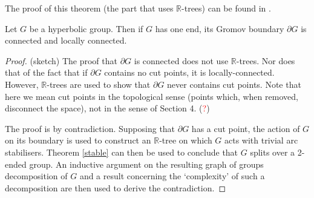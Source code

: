 The proof of this theorem (the part that uses $\mathbb{R}$-trees) can be found in \cite{Swarup}.
\begin{theorem}
    Let $G$ be a hyperbolic group. Then if $G$ has one end, its Gromov boundary $\partial G$ is connected and locally connected.
\end{theorem}

\begin{proof}
    (sketch) The proof that $\partial G$ is connected does not use $\mathbb{R}$-trees. Nor does that of the fact that if $\partial G$ contains no cut points, it is locally-connected. However, $\mathbb{R}$-trees are used to show that $\partial G$ never contains cut points. Note that here we mean cut points in the topological sense (points which, when removed, disconnect the space), not in the sense of Section 4. (\textcolor{red}{?})
    
    The proof is by contradiction. Supposing that $\partial G$ has a cut point, the action of $G$ on its boundary is used to construct an $\mathbb{R}$-tree on which $G$ acts with trivial arc stabilisers. Theorem \ref{stable} can then be used to conclude that $G$ splits over a 2-ended group. An inductive argument on the resulting graph of groups decomposition of $G$ and a result concerning the `complexity' of such a decomposition are then used to derive the contradiction.
\end{proof}









